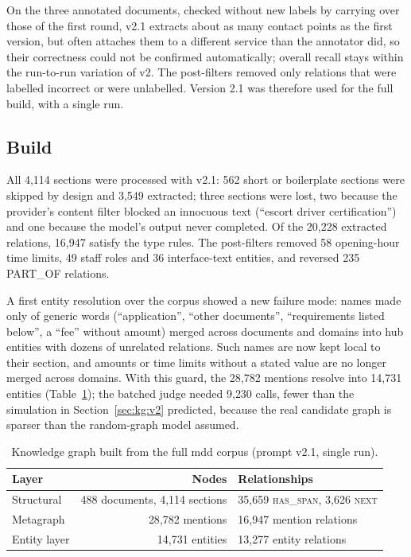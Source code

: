 On the three annotated documents, checked without new labels by carrying over those of
the first round, v2.1 extracts about as many contact points as the first version, but often
attaches them to a different service than the annotator did, so their correctness could
not be confirmed automatically; overall recall stays within the run-to-run variation of
v2. The post-filters removed only relations that were labelled incorrect or were
unlabelled. Version 2.1 was therefore used for the full build, with a single run.

\subsection{Build}

All 4{,}114 sections were processed with v2.1: 562 short or boilerplate sections were
skipped by design and 3{,}549 extracted; three sections were lost, two because the
provider's content filter blocked an innocuous text (``escort driver certification'')
and one because the model's output never completed. Of the 20{,}228 extracted
relations, 16{,}947 satisfy the type rules. The post-filters removed 58 opening-hour
time limits, 49 staff roles and 36 interface-text entities, and reversed 235 PART\_OF
relations.

A first entity resolution over the corpus showed a new failure mode: names made only of
generic words (``application'', ``other documents'', ``requirements listed below'', a
``fee'' without amount) merged across documents and domains into hub entities with
dozens of unrelated relations. Such names are now kept local to their section, and
amounts or time limits without a stated value are no longer merged across domains.
With this guard, the 28{,}782 mentions resolve into 14{,}731 entities
(Table~\ref{tab:kg:full}); the batched judge needed 9{,}230 calls, fewer than the
simulation in Section~\ref{sec:kg:v2} predicted, because the real candidate graph is
sparser than the random-graph model assumed.

\begin{table}[ht]
    \centering
    \caption{Knowledge graph built from the full \gls{mdd} corpus (prompt v2.1, single run).}
    \label{tab:kg:full}
    \begin{tabular}{lrl}
        \toprule
        Layer & Nodes & Relationships \\
        \midrule
        Structural   & 488 documents, 4{,}114 sections & 35{,}659 \textsc{has\_span}, 3{,}626 \textsc{next} \\
        Metagraph    & 28{,}782 mentions & 16{,}947 mention relations \\
        Entity layer & 14{,}731 entities & 13{,}277 entity relations \\
        \bottomrule
    \end{tabular}
\end{table}

